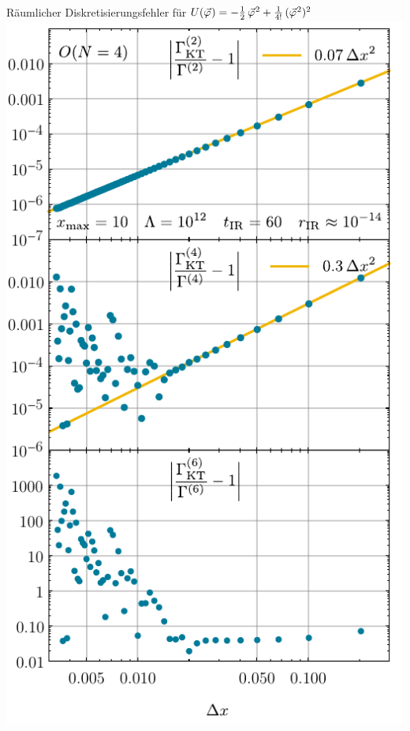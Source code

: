 \begin{frame}{Räumlicher Diskretisierungsfehler für $	U ( \vec{\varphi} \mskip1.0mu ) = -\tfrac{1}{2} \, \vec{\varphi}^{\mskip1.0mu 2} + \tfrac{1}{4!} \, ( \vec{\varphi}^{\mskip1.0mu 2} )^2 $}
	\label{0dscaling}
	\centering
	\includegraphics[width=0.38\framewidth]{../0d/figures/sc_ii_n_on_4_xmax_10_lambda_1e12_tir_60_deltax_scaling.pdf} 
\end{frame}

